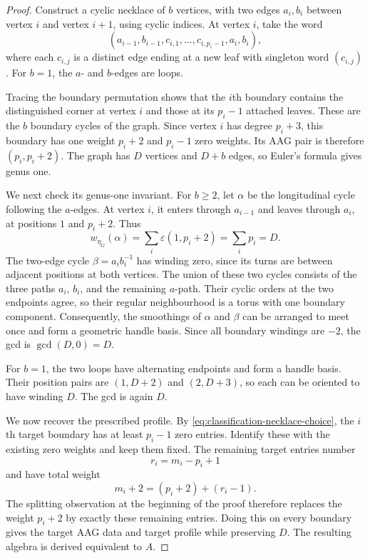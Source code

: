 \documentclass[11pt]{amsart}
\theoremstyle{definition}
\theoremstyle{plain}
\theoremstyle{definition}
\theoremstyle{definition}
\begin{document}
\begin{proof}
Construct a cyclic necklace of $b$ vertices, with
two edges $a_i,b_i$ between vertex $i$ and vertex
$i+1$, using cyclic indices.
At vertex $i$, take the word
\begin{equation}
\label{eq:classification-necklace}
 (a_{i-1},b_{i-1},
  c_{i,1},\ldots,c_{i,p_i-1},
  a_i,b_i),
\end{equation}
where each $c_{i,j}$ is a distinct edge ending at
a new leaf with singleton word $(c_{i,j})$.
For $b=1$, the $a$- and $b$-edges are loops.

Tracing the boundary permutation shows that the
$i$th boundary contains the distinguished corner
at vertex $i$ and those at its $p_i-1$ attached leaves.
These are the $b$ boundary cycles of the graph.
Since vertex $i$ has degree $p_i+3$, this boundary
has one weight $p_i+2$ and $p_i-1$ zero weights.
Its AAG pair is therefore $(p_i,p_i+2)$.
The graph has $D$ vertices and $D+b$ edges, so
Euler's formula gives genus one.

We next check its genus-one invariant.
For $b\geq2$, let $\alpha$ be the longitudinal cycle
following the $a$-edges.
At vertex $i$, it enters through $a_{i-1}$ and leaves
through $a_i$, at positions $1$ and $p_i+2$.
Thus
\[
 w_{\eta_G}(\alpha)
 =\sum_i\varepsilon(1,p_i+2)
 =\sum_i p_i
 =D.
\]
The two-edge cycle $\beta=a_i b_i^{-1}$ has winding
zero, since its turns are between adjacent positions
at both vertices.
The union of these two cycles consists of the three
paths $a_i$, $b_i$, and the remaining $a$-path.
Their cyclic orders at the two endpoints agree,
so their regular neighbourhood is a torus with one
boundary component.
Consequently, the smoothings of $\alpha$ and $\beta$
can be arranged to meet once and form a geometric
handle basis.
Since all boundary windings are $-2$, the gcd is
$\gcd(D,0)=D$.

For $b=1$, the two loops have alternating endpoints
and form a handle basis.
Their position pairs are $(1,D+2)$ and $(2,D+3)$,
so each can be oriented to have winding $D$.
The gcd is again $D$.

We now recover the prescribed profile.
By \eqref{eq:classification-necklace-choice}, the
$i$th target boundary has at least $p_i-1$ zero
entries.
Identify these with the existing zero weights and
keep them fixed.
The remaining target entries number
\[
 r_i=m_i-p_i+1
\]
and have total weight
\[
 m_i+2=(p_i+2)+(r_i-1).
\]
The splitting observation at the beginning of the
proof therefore replaces the weight $p_i+2$ by
exactly these remaining entries.
Doing this on every boundary gives the target AAG
data and target profile while preserving $D$.
The resulting algebra is derived equivalent to $A$.


\end{proof}
\end{document}
